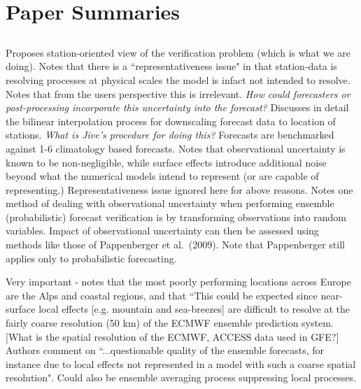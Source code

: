 \documentclass{article}
\begin{document}
\begin{comment}
Note that the Bureau has not yet moved to ensemble forecasting - and probabilistic verification methods are therefore not appropriate. 
\end{comment}

\section{Paper Summaries}

\subsection{\citet{pinson12}}
Proposes station-oriented view of the verification problem (which is what we are doing). Notes that there is a ``representativeness issue" in that station-data is resolving processes at physical scales the model is infact not intended to resolve. Notes that from the users perspective this is irrelevant. \textit{How could forecasters or post-processing incorporate this uncertainty into the forecast?} Discusses in detail the bilinear interpolation process for downscaling forecast data to location of stations. \textit{What is Jive's procedure for doing this?} Forecasts are benchmarked against 1-6 climatology based forecasts. Notes that observational uncertainty is known to be non-negligible, while surface effects introduce additional noise beyond what the numerical models intend to represent (or are capable of representing.) Representativeness issue ignored here for above reasons. Notes one method of dealing with observational uncertainty when performing ensemble (probabilistic) forecast verification is by transforming observations into random variables. Impact of observational uncertainty can then be assessed using methods like those of Pappenberger et al.~(2009). Note that Pappenberger still applies only to probabilistic forecasting. 

Very important - notes that the most poorly performing locations across Europe are the Alps and coastal regions, and that ``This could be expected since near-surface local effects [e.g. mountain and sea-breezes] are difficult to resolve at the fairly coarse resolution (50 km) of the ECMWF ensemble prediction system. [What is the spatial resolution of the ECMWF, ACCESS data used in GFE?] Authors comment on ``...questionable quality of the ensemble forecasts, for instance due to local effects not represented in a model with such a coarse spatial resolution". Could also be ensemble averaging process suppressing local processes.    
\end{document}
